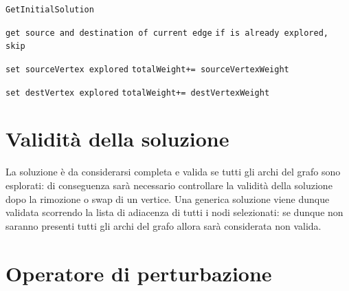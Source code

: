 \documentclass[11pt]{article}
\begin{document}
\begin{algorithm}
    \caption{\texttt{GetInitialSolution}}
    \begin{algorithmic}
        

        \State \texttt{get source and destination of current edge}
        \State \texttt{if is already explored, skip}

            \State\texttt {set sourceVertex explored}
            \State\texttt{totalWeight+= sourceVertexWeight}

        \Else{\texttt{}}

        \State\texttt {set destVertex explored}
        \State\texttt{totalWeight+= destVertexWeight}


        \EndIf{}
        \EndFor
        

    \end{algorithmic}
    \end{algorithm}


\pagebreak

\section{Validità della soluzione}

La soluzione è da considerarsi completa e valida se tutti gli archi del grafo sono esplorati: di conseguenza sarà necessario controllare la validità della soluzione dopo la rimozione o swap di un vertice.
Una generica soluzione viene dunque validata scorrendo la lista di adiacenza di tutti i nodi selezionati: se dunque non saranno presenti tutti gli archi del grafo allora sarà considerata non valida.

\section{Operatore di perturbazione}
\end{document}
